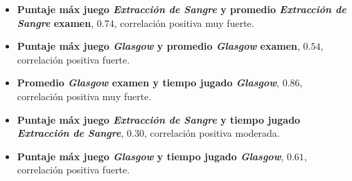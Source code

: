 \documentclass[portrait,final,a0paper,fontscale=0.277]{baposter}
\begin{document}
\begin{poster}
{\begin{multicols}{2}
\begin{itemize}
\begin{center}
	\scriptsize 
	\begin{itemize}
		\item \textbf{Puntaje máx juego \textit{Extracción de Sangre} y promedio 
		\textit{Extracción de Sangre} examen}, $0.74$, 
		correlación positiva muy fuerte.
		\item \textbf{Puntaje máx juego \textit{Glasgow} y promedio 
		\textit{Glasgow} examen}, $0.54$, correlación positiva 
		fuerte.
		\item \textbf{Promedio \textit{Glasgow} examen y tiempo jugado 
		\textit{Glasgow}}, $0.86$, correlación positiva muy fuerte.
		\item \textbf{Puntaje máx juego \textit{Extracción de Sangre} y tiempo 
		jugado \textit{Extracción de Sangre}}, $0.30$, correlación positiva 
		moderada.
		\item \textbf{Puntaje máx juego \textit{Glasgow} y tiempo jugado 
		\textit{Glasgow}}, $0.61$, correlación positiva fuerte. 
	\end{itemize}
		
	\end{center}
	
	
\end{itemize}


\end{multicols}
   \vspace{0.3em}
  }


\end{poster}
\end{document}
